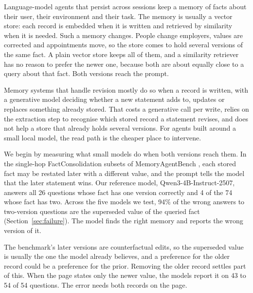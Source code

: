 \documentclass[11pt]{article}
\begin{document}
Language-model agents that persist across sessions keep a memory of facts about their user, their environment and their task. The memory is usually a vector store: each record is embedded when it is written and retrieved by similarity when it is needed. %
Such a memory changes. People change employers, values are corrected and appointments move, so the store comes to hold several versions of the same fact. A plain vector store keeps all of them, and a similarity retriever has no reason to prefer the newer one, because both are about equally close to a query about that fact. Both versions reach the prompt.

Memory systems that handle revision mostly do so when a record is written, with a generative model deciding whether a new statement adds to, updates or replaces something already stored. %
That costs a generative call per write, relies on the extraction step to recognise which stored record a statement revises, and does not help a store that already holds several versions. For agents built around a small local model, the read path is the cheaper place to intervene.

We begin by measuring what small models do when both versions reach them. In the single-hop FactConsolidation subsets of MemoryAgentBench \cite{hu2026memoryagentbench}, each stored fact may be restated later with a different value, and the prompt tells the model that the later statement wins. Our reference model, Qwen3-4B-Instruct-2507, answers all 26 questions whose fact has one version correctly and 4 of the 74 whose fact has two. Across the five models we test, 94\% of the wrong answers to two-version questions are the superseded value of the queried fact (Section~\ref{sec:failure}). The model finds the right memory and reports the wrong version of it.

The benchmark's later versions are counterfactual edits, so the superseded value is usually the one the model already believes, and a preference for the older record could be a preference for the prior. Removing the older record settles part of this. When the page states only the newer value, the models report it on 43 to 54 of 54 questions. The error needs both records on the page.
\end{document}
